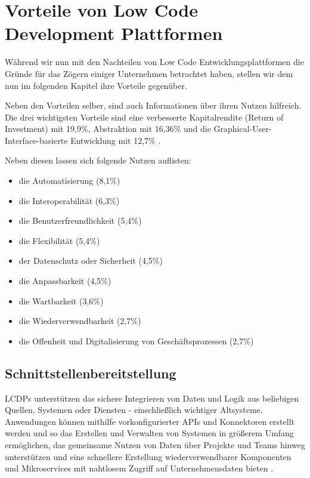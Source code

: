 \documentclass[12pt]{article} %
\begin{document}
	\section{Vorteile von Low Code Development Plattformen}
	Während wir nun mit den Nachteilen von Low Code Entwicklungsplattformen die Gründe für das Zögern einiger Unternehmen betrachtet haben, stellen wir dem nun im folgenden Kapitel ihre Vorteile gegenüber.\newline
	
	Neben den Vorteilen selber, sind auch Informationen über ihren Nutzen hilfreich. Die drei wichtigsten Vorteile sind eine verbesserte Kapitalrendite (Return of Investment) mit 19,9\%, Abstraktion mit 16,36\% und die Graphical-User-Interface-basierte Entwicklung mit 12,7\% \autocite{Bucaioni.2022}. 
	
	Neben diesen lassen sich folgende Nutzen auflisten: 
	\begin{itemize}
		\item die Automatisierung (8,1\%)
		\item die Interoperabilität (6,3\%)
		\item die Benutzerfreundlichkeit (5,4\%) 
		\item die Flexibilität (5,4\%) 
		\item der Datenschutz oder Sicherheit (4,5\%)
		\item die Anpassbarkeit (4,5\%)
		\item die Wartbarkeit (3,6\%)
		\item die Wiederverwendbarkeit (2,7\%)
		\item die Offenheit und Digitalisierung von Geschäftsprozessen (2,7\%)
	\end{itemize}
		\autocite{Bucaioni.2022} 
	
	\subsection{Schnittstellenbereitstellung} 
	LCDPs unterstützen das sichere Integrieren von Daten und Logik aus beliebigen Quellen, Systemen oder Diensten - einschließlich wichtiger Altsysteme. Anwendungen können mithilfe vorkonfigurierter APIs und Konnektoren erstellt werden und so das Erstellen und Verwalten von Systemen in größerem Umfang ermöglichen, das gemeinsame Nutzen von Daten über Projekte und Teams hinweg unterstützen und eine schnellere Erstellung wiederverwendbarer Komponenten und Mikroservices mit nahtlosem Zugriff auf Unternehmensdaten bieten \autocite{Mendix.2023}.
	
\end{document}
